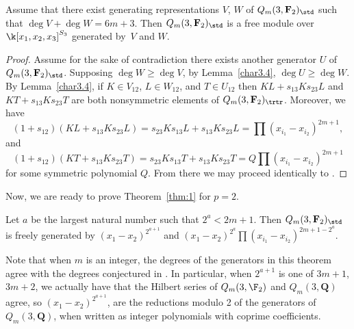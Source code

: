 \begin{Lemma}\label{charFree}
 Assume that there exist generating representations $V$, $W$ of $Q_m(3,\mathbf{F}_2)_\std$ such that $\deg V+\deg W=6m+3$. Then $Q_m(3,\mathbf{F}_2)_\std$ is a free module over $\k[x_1,x_2,x_3]^{S_3}$ generated by~$V$ and $W$.
\end{Lemma}
\begin{proof}
 Assume for the sake of contradiction there exists another generator $U$ of $Q_m(3,\mathbf{F}_2)_{\std}$. Supposing $\deg W\geq \deg V$, by Lemma~\ref{char3.4}, $\deg U\geq \deg W$. By Lemma~\ref{char3.4}, if $K\in V_{12}$, $L\in W_{12}$, and $T\in U_{12}$ then $KL+s_{13}Ks_{23}L$ and $KT+s_{13}Ks_{23}T$ are both nonsymmetric elements of $Q_m(3,\mathbf{F}_2)_{\trtr}$. Moreover, we have
 \[(1+s_{12})(KL+s_{13}Ks_{23}L) = s_{23}Ks_{13}L+s_{13}Ks_{23}L = \prod (x_{i_1}-x_{i_2})^{2m+1},\]
 and
 \[(1+s_{12})(KT+s_{13}Ks_{23}T) = s_{23}Ks_{13}T+s_{13}Ks_{23}T = Q\prod (x_{i_1}-x_{i_2})^{2m+1}\]
 for some symmetric polynomial $Q$. From there we may proceed identically to \cite{wang2022explicit}.
\end{proof}

Now, we are ready to prove Theorem~\ref{thm:1} for $p=2$.

\begin{Theorem}\label{thm:p2}
 Let $a$ be the largest natural number such that $2^a< 2m+1$. Then $Q_m(3,\mathbf{F}_2)_{\std}$ is freely generated by $(x_1-x_2)^{2^{a+1}}$ and $(x_1-x_2)^{2^a}\prod (x_{i_1}-x_{i_2})^{2m+1-2^a}$.
\end{Theorem}

\begin{Remark}
 Note that when $m$ is an integer, the degrees of the generators in this theorem agree with the degrees conjectured in \cite{Ren_2020}. In particular, when $2^{a+1}$ is one of $3m+1$, ${3m+2}$, we actually have that the Hilbert series of $Q_m(3,\F_2)$ and $Q_m(3,\mathbf{Q})$ agree, so $(x_1-x_2)^{2^{a+1}}$,  are the reductions modulo 2 of the generators of $Q_m(3,\mathbf{Q})$, when written as integer polynomials with coprime coefficients.
\end{Remark}


